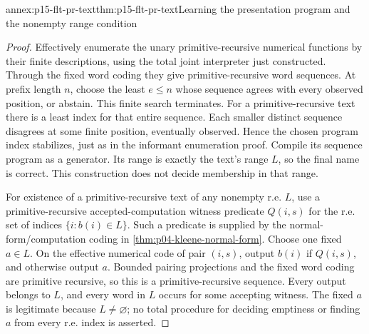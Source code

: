\begin{annexitem}{annex:p15-flt-pr-text}{thm:p15-flt-pr-text}{Learning the presentation program and the nonempty range condition}
\begin{proof}
Effectively enumerate the unary primitive-recursive numerical
functions by their finite descriptions, using the total
joint interpreter just constructed. Through the fixed word
coding they give primitive-recursive word sequences.
At prefix length \(n\), choose the least \(e\leq n\) whose
sequence agrees with every observed position, or abstain.
This finite search terminates. For a primitive-recursive
text there is a least index for that entire sequence.
Each smaller distinct sequence disagrees at some finite
position, eventually observed. Hence the chosen program
index stabilizes, just as in the informant enumeration proof.
Compile its sequence program as a generator. Its range is
exactly the text's range \(L\), so the final name is correct.
This construction does not decide membership in that range.

For existence of a primitive-recursive text of any nonempty
r.e. \(L\), use a primitive-recursive accepted-computation
witness predicate \(Q(i,s)\) for the r.e. set of indices
\(\{i:b(i)\in L\}\). Such a predicate is supplied by the
normal-form/computation coding in
\cref{thm:p04-kleene-normal-form}.
Choose one fixed \(a\in L\).
On the effective numerical code of pair \((i,s)\),
output \(b(i)\) if \(Q(i,s)\), and otherwise output \(a\).
Bounded pairing projections and the fixed word coding
are primitive recursive, so this is a primitive-recursive
sequence. Every output belongs to \(L\), and every word
in \(L\) occurs for some accepting witness.
The fixed \(a\) is legitimate because \(L\ne\varnothing\);
no total procedure for deciding emptiness or finding \(a\)
from every r.e. index is asserted.
\end{proof}
\end{annexitem}

